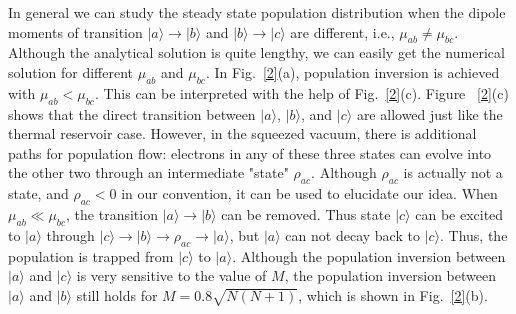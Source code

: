 \documentclass[aps,showpacs,onecolumn,twoside,groupedaddress]{revtex4}
\begin{document}
In general we can study the steady state population distribution when the dipole moments of transition $|a\rangle\rightarrow|b\rangle$ and $|b\rangle\rightarrow|c\rangle$ are different, i.e., $\mu_{ab}\ne\mu_{bc}$. Although the analytical solution is quite lengthy, we can easily get the numerical solution for different $\mu_{ab}$ and $\mu_{bc}$. In Fig.~\ref{2}(a), population inversion is achieved with $\mu_{ab}<\mu_{bc}$. This can be interpreted with the help of Fig.~\ref{2}(c). Figure ~\ref{2}(c) shows that the direct transition between $|a\rangle$, $|b\rangle$, and $|c\rangle$ are allowed just like the thermal reservoir case. However, in the squeezed vacuum, there is additional paths for population flow: electrons in any of these three states can evolve into the other two through an intermediate "state" $\rho_{ac}$. Although $\rho_{ac}$ is actually not a state, and $\rho_{ac}<0$ in our convention, it can be used to elucidate our idea. When $\mu_{ab}\ll\mu_{bc}$, the transition $|a\rangle\rightarrow|b\rangle$ can be removed. Thus state $|c\rangle$ can be excited to $|a\rangle$ through $|c\rangle\rightarrow|b\rangle\rightarrow\rho_{ac}\rightarrow|a\rangle$, but $|a\rangle$ can not decay back to $|c\rangle$. Thus, the population is trapped from $|c\rangle$ to $|a\rangle$. Although the population inversion between $|a\rangle$ and $|c\rangle$ is very sensitive to the value of $M$, the population inversion between $|a\rangle$ and $|b\rangle$ still holds for $M=0.8\sqrt{N(N+1)}$, which is shown in Fig.~\ref{2}(b).
\end{document}
